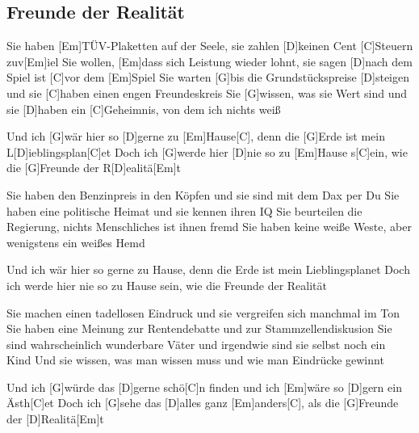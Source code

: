 \subsection*{Freunde der Realität   }
\begin{guitar}

Sie haben [Em]TÜV-Plaketten auf der Seele,
sie zahlen [D]keinen Cent [C]Steuern zuv[Em]iel
Sie wollen, [Em]dass sich Leistung wieder lohnt,
sie sagen [D]nach dem Spiel ist [C]vor dem [Em]Spiel
Sie warten [G]bis die Grundstückspreise [D]steigen
und sie [C]haben einen engen Freundeskreis
Sie [G]wissen, was sie Wert sind und sie [D]haben
ein [C]Geheimnis, von dem ich nichts weiß




Und ich [G]wär hier so [D]gerne zu [Em]Hause[C],
denn die [G]Erde ist mein L[D]ieblingsplan[C]et
Doch ich [G]werde hier [D]nie so zu [Em]Hause s[C]ein,
wie die [G]Freunde der R[D]ealitä[Em]t



Sie haben den Benzinpreis in den Köpfen
und sie sind mit dem Dax per Du
Sie haben eine politische Heimat
und sie kennen ihren IQ
Sie beurteilen die Regierung,
nichts Menschliches ist ihnen fremd
Sie haben keine weiße Weste,
aber wenigstens ein weißes Hemd


Und ich wär hier so gerne zu Hause,
denn die Erde ist mein Lieblingsplanet
Doch ich werde hier nie so zu Hause sein,
wie die Freunde der Realität


Sie machen einen tadellosen Eindruck
und sie vergreifen sich manchmal im Ton
Sie haben eine Meinung zur Rentendebatte
und zur Stammzellendiskusion
Sie sind wahrscheinlich wunderbare Väter
und irgendwie sind sie selbst noch ein Kind
Und sie wissen, was man wissen muss
und wie man Eindrücke gewinnt



Und ich [G]würde das [D]gerne schö[C]n finden
und ich [Em]wäre so [D]gern ein Ästh[C]et
Doch ich [G]sehe das [D]alles ganz [Em]anders[C],
als die [G]Freunde der [D]Realitä[Em]t

\end{guitar}

